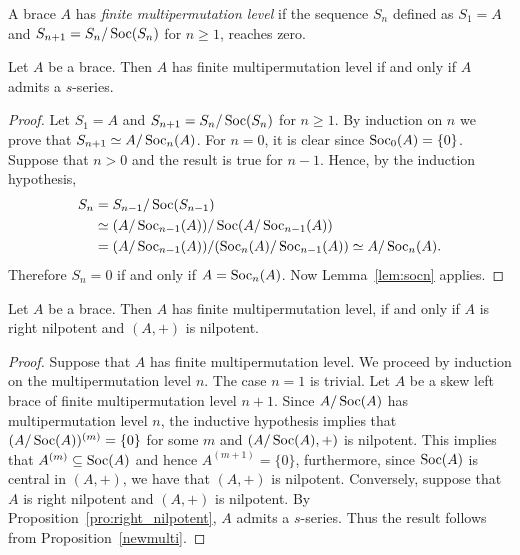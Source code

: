 

\begin{definition}
A brace $A$ has \emph{finite multipermutation level} if
the sequence $S_n$ defined as $S_1=A$ and $S_{n+1}=S_n/\operatorname{Soc}(S_n)$
for $n\geq1$, reaches zero.
\end{definition}

\begin{proposition}
\label{newmulti}
Let $A$ be a brace. Then $A$ has finite
multipermutation level if and only if $A$ admits a $s$-series.
\end{proposition}

\begin{proof}
Let $S_1=A$ and $S_{n+1}=S_n/\operatorname{Soc}(S_n)$ for
$n\geq1$. By induction on $n$ we prove that $S_{n+1}\simeq A/\operatorname{Soc}_n(A)$. 
For $n=0$, it is clear since $\operatorname{Soc}_0(A)=\{0\}$.
Suppose that $n>0$ and the result is true for $n-1$. Hence, by the
induction hypothesis,
\begin{align*}
S_n&=S_{n-1}/\operatorname{Soc}(S_{n-1})\\
&\simeq (A/\operatorname{Soc}_{n-1}(A))/\operatorname{Soc}(A/\operatorname{Soc}_{n-1}(A))\\
&=(A/\operatorname{Soc}_{n-1}(A))/(\operatorname{Soc}_n(A)/\operatorname{Soc}_{n-1}(A))\simeq A/\operatorname{Soc}_n(A).
\end{align*} 
Therefore $S_n=0$ if and only if
$A=\operatorname{Soc}_n(A)$. Now Lemma~\ref{lem:socn} applies.
\end{proof}

\begin{theorem}
\label{thm:mpl&right_nilpotent}
Let $A$ be a brace. Then $A$ has finite multipermutation level, if and only
if  $A$ is right nilpotent and $(A,+)$ is nilpotent.
\end{theorem}

\begin{proof}
Suppose that $A$ has finite multipermutation level.
We proceed by induction on the multipermutation level $n$. The case
$n=1$ is trivial.  Let $A$ be a skew left brace of
    finite multipermutation level $n+1$. Since $A/\operatorname{Soc}(A)$ has multipermutation
    level $n$, the inductive hypothesis implies that $(A/\operatorname{Soc}(A))^{(m)}=\{0\}$ for
    some $m$ and $(A/\operatorname{Soc}(A),+)$ is nilpotent. This implies that
    $A^{(m)}\subseteq\operatorname{Soc}(A)$ and hence $A^{(m+1)}=\{0\}$, furthermore, since
    $\operatorname{Soc}(A)$ is central in $(A,+)$, we have that $(A,+)$ is nilpotent.
Conversely, suppose that $A$ is right nilpotent and $(A,+)$ is
nilpotent.  By Proposition~\ref{pro:right_nilpotent}, $A$ admits a
$s$-series. Thus the result follows from Proposition~\ref{newmulti}.
\end{proof}

